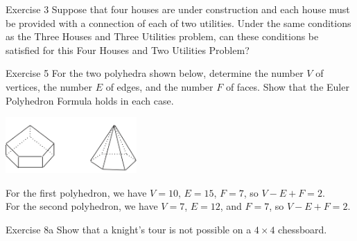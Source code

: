 \documentclass[8pt]{extarticle}
\title{}
\author{Avinash Iyer}
\date{}
\begin{document}
{
  \begin{problem}{Exercise 3}
    Suppose that four houses are under construction and each house must be provided with a connection of each of two utilities. Under the same conditions as the Three Houses and Three Utilities problem, can these conditions be satisfied for this Four Houses and Two Utilities Problem?
    \tcblower
    \begin{center}
    \end{center}
  \end{problem}
  \begin{problem}{Exercise 5}
    For the two polyhedra shown below, determine the number $V$ of vertices, the number $E$ of edges, and the number $F$ of faces. Show that the Euler Polyhedron Formula holds in each case.
    \begin{center}
      \includegraphics[width=5cm]{exercise_5}
    \end{center}
    \tcblower
    For the first polyhedron, we have $V = 10$, $E = 15$, $F = 7$, so $V-E+F = 2$.\\

    For the second polyhedron, we have $V = 7$, $E = 12$, and $F = 7$, so $V-E+F = 2$.
  \end{problem}
  \begin{problem}{Exercise 8a}
    Show that a knight's tour is not possible on a $4\times 4$ chessboard.
    \tcblower
    
  \end{problem}
}
\end{document}
